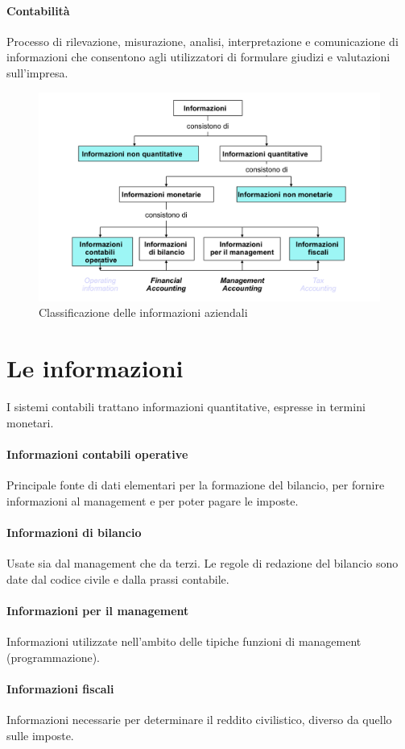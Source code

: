 \documentclass{report}
\begin{document}
	\paragraph{Contabilità} Processo di rilevazione, misurazione, analisi, interpretazione e comunicazione di informazioni che consentono agli utilizzatori di formulare giudizi e valutazioni sull'impresa.
	\begin{figure}[h]
		\centering
		\includegraphics[width=0.7\linewidth]{classificazione-informazioni}
		\caption{Classificazione delle informazioni aziendali}
		\label{fig:classificazione-informazioni}
	\end{figure}
	\section{Le informazioni} I sistemi contabili trattano informazioni quantitative, espresse in termini monetari.
	\paragraph{Informazioni contabili operative} Principale fonte di dati elementari per la formazione del bilancio, per fornire informazioni al management e per poter pagare le imposte.
	\paragraph{Informazioni di bilancio} Usate sia dal management che da terzi. Le regole di redazione del bilancio sono date dal codice civile e dalla prassi contabile.
	\paragraph{Informazioni per il management} Informazioni utilizzate nell'ambito delle tipiche funzioni di management (programmazione).
	\paragraph{Informazioni fiscali} Informazioni necessarie per determinare il reddito civilistico, diverso da quello sulle imposte.
\end{document}
